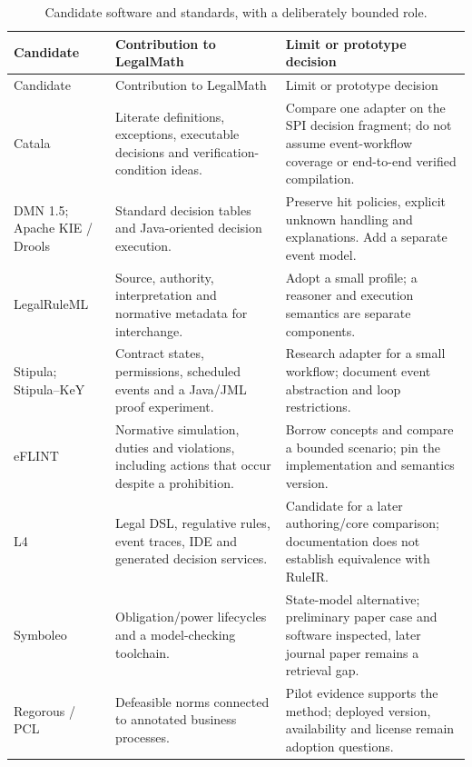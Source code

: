 \documentclass[12pt,a4paper,oneside,openany]{book}
\begin{document}
\begingroup\small
\begin{longtable}{P{0.19\textwidth}P{0.37\textwidth}P{0.34\textwidth}}
\caption{Candidate software and standards, with a deliberately bounded role.}
\label{tab:software}\\
\toprule Candidate & Contribution to LegalMath & Limit or prototype decision \\\midrule
\endfirsthead
\toprule Candidate & Contribution to LegalMath & Limit or prototype decision \\\midrule
\endhead
Catala & Literate definitions, exceptions, executable decisions and verification-condition ideas. & Compare one adapter on the SPI decision fragment; do not assume event-workflow coverage or end-to-end verified compilation. \citep{catalacode}\\
DMN 1.5; Apache KIE / Drools & Standard decision tables and Java-oriented decision execution. & Preserve hit policies, explicit unknown handling and explanations. Add a separate event model. \citep{dmn2024,droolscode}\\
LegalRuleML & Source, authority, interpretation and normative metadata for interchange. & Adopt a small profile; a reasoner and execution semantics are separate components. \citep{legalruleml2021}\\
Stipula; Stipula--KeY & Contract states, permissions, scheduled events and a Java/JML proof experiment. & Research adapter for a small workflow; document event abstraction and loop restrictions. \citep{stipulacode,stipulakeycode}\\
eFLINT & Normative simulation, duties and violations, including actions that occur despite a prohibition. & Borrow concepts and compare a bounded scenario; pin the implementation and semantics version. \citep{eflint2026}\\
L4 & Legal DSL, regulative rules, event traces, IDE and generated decision services. & Candidate for a later authoring/core comparison; documentation does not establish equivalence with RuleIR. \citep{l4code}\\
Symboleo & Obligation/power lifecycles and a model-checking toolchain. & State-model alternative; preliminary paper case and software inspected, later journal paper remains a retrieval gap. \citep{symboleo2020,symboleocode}\\
Regorous / PCL & Defeasible norms connected to annotated business processes. & Pilot evidence supports the method; deployed version, availability and license remain adoption questions. \citep{semanticcompliance2016}\\

\end{longtable}
\end{document}
